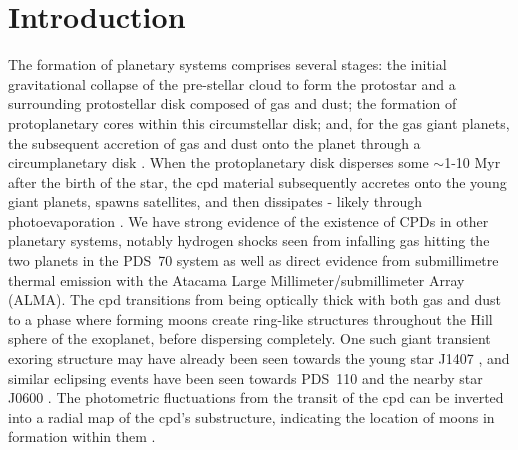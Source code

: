 \documentclass[longauth]{aa} %
\begin{document}

   \maketitle
%

\section{Introduction}

The formation of planetary systems comprises several stages: the initial gravitational collapse of the pre-stellar cloud to form the protostar and a surrounding protostellar disk composed of gas and dust; the formation of protoplanetary cores within this circumstellar disk; and, for the gas giant planets, the subsequent accretion of gas and dust onto the planet through a circumplanetary disk \citep[CPD;][]{Lubow99, Lambrechts12, Mordasini18}.
%
When the protoplanetary disk disperses some $\sim$1-10 Myr after the birth of the star, the \ac{cpd} material subsequently accretes onto the young giant planets, spawns satellites, and then dissipates - likely through photoevaporation \citep[e.g.][]{Mamajek09, Canup02, Oberg20}.
%
We have strong evidence of the existence of CPDs in other planetary systems, notably hydrogen shocks seen from infalling gas hitting the two planets in the PDS~70 system \citep{Keppler18,Haffert19} as well as direct evidence from submillimetre thermal emission  \citep{Isella19} with the Atacama Large Millimeter/submillimeter Array (ALMA).
% 
The \ac{cpd} transitions from being optically thick with both gas and dust to a phase where forming moons create ring-like structures throughout the Hill sphere of the exoplanet, before dispersing completely. One such giant transient exoring structure may have already been seen towards the young star J1407 \citep[V1400 Cen;][]{Mamajek12, Kenworthy15}, and similar eclipsing events have been seen towards PDS~110 \citep{Osborn17,Osborn19} and the nearby star J0600 \citep{Way19,Way19b}.
%
The photometric fluctuations from the transit of the \ac{cpd} can be inverted into a radial map of the \ac{cpd}'s substructure, indicating the location of moons in formation within them \citep{Kenworthy15}.
\end{document}
